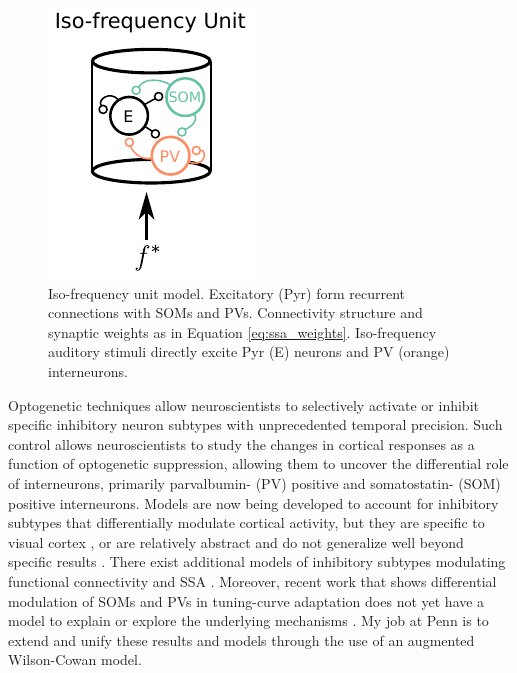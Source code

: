 \documentclass[a4paper,11pt]{article}
\begin{document}
\begin{figure}
\centering
 \includegraphics[]{col1.pdf}
 \caption{Iso-frequency unit model. Excitatory (Pyr) form recurrent connections with SOMs and PVs. Connectivity structure and synaptic weights as in Equation \eqref{eq:ssa_weights}. Iso-frequency auditory stimuli directly excite Pyr (E) neurons and PV (orange) interneurons.}\label{ref:col1}
\end{figure}

Optogenetic techniques allow neuroscientists to selectively activate or inhibit specific inhibitory neuron subtypes with unprecedented temporal precision. Such control allows neuroscientists to study the changes in cortical responses as a function of optogenetic suppression, allowing them to uncover the differential role of interneurons, primarily parvalbumin- (PV) positive and somatostatin- (SOM) positive interneurons. Models are now being developed to account for inhibitory subtypes that differentially modulate cortical activity, but they are specific to visual cortex \cite{litwin2016inhibitory}, or are relatively abstract and do not generalize well beyond specific results \cite{seybold2015inhibitory,phillips2016asymmetric,phillips2017cortical}. There exist additional models of inhibitory subtypes modulating functional connectivity \cite{hamilton2013optogenetic} and SSA \cite{natan2015complementary}. Moreover, recent work that shows differential modulation of SOMs and PVs in tuning-curve adaptation does not yet have a model to explain or explore the underlying mechanisms \cite{natan2017cortical}. My job at Penn is to extend and unify these results and models through the use of an augmented Wilson-Cowan model.

\end{document}
